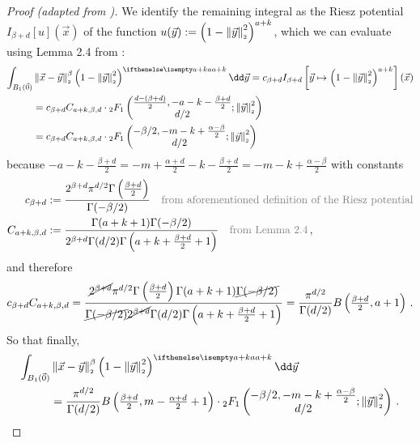 \begin{proof}[Proof (adapted from \cite{2021-arbitrary-dimensions})]
  We identify the remaining integral as the Riesz potential $I_{\beta+d}[u](\vec{x})$ of the function $u(\vec{y}) := \left(1-\left\lVert\vec{y}\right\rVert_{\scriptscriptstyle 2}^2\right)^{a+k}$, which we can evaluate using Lemma 2.4 from \cite{2011-porous-medium-1}:
  \begin{align*}
    \int_{B_1(\vec{0})} & \norm{\vec{x}-\vec{y}}^\beta \weight[a+k]{y} \dd\vec{y} = c_{\beta+d} I_{\beta+d}\left[\vec{y} \mapsto \left(1-\norm{\vec{y}}^2\right)^{a+k}\right](\vec{x}) \\
                        & = c_{\beta+d} C_{a+k, \beta, d} \cdot {}_2F_1\left(\begin{matrix}\frac{d-(\beta+d)}{2}, -a-k-\frac{\beta+d}{2} \\d/2\end{matrix}; \norm{\vec{y}}^2\right)    \\
                        & = c_{\beta+d} C_{a+k, \beta, d} \cdot {}_2F_1\left(\begin{matrix}-\beta/2, -m-k+\frac{\alpha-\beta}{2} \\d/2\end{matrix}; \norm{\vec{y}}^2\right)
  \end{align*}
  because $-a-k-\frac{\beta+d}{2} = -m + \frac{\alpha+d}{2} -k - \frac{\beta+d}{2} = -m-k+\frac{\alpha-\beta}{2}$ with constants
  \begin{align*}
    c_{\beta+d}       & := \frac{2^{\beta+d} \pi^{d/2} \Gamma\left(\frac{\beta+d}{2}\right)}{\Gamma(-\beta/2)}                      \quad \text{\textcolor{gray}{from aforementioned definition of the Riesz potential}} \\
    C_{a+k, \beta, d} & := \frac{\Gamma(a+k+1) \Gamma(-\beta/2)}{2^{\beta+d}\Gamma(d/2) \Gamma\left(a+k+\frac{\beta+d}{2}+1\right)} \quad \text{\textcolor{gray}{from Lemma 2.4}}\,,
  \end{align*}
  and therefore
  $$c_{\beta+d} C_{a+k, \beta, d} = \frac{\cancel{2^{\beta+d}} \pi^{d/2} \Gamma\left(\frac{\beta+d}{2}\right) \Gamma(a+k+1) \cancel{\Gamma(-\beta/2)}}{\cancel{\Gamma(-\beta/2)} \cancel{2^{\beta+d}}\Gamma(d/2) \Gamma\left(a+k+\frac{\beta+d}{2}+1\right)} = \frac{\pi^{d/2}}{\Gamma(d/2)} B\left(\tfrac{\beta+d}{2}, a+1\right)\,.$$
  So that finally,
  \begin{align*}
    \int_{B_1(\vec{0})} & \norm{\vec{x}-\vec{y}}^\beta \weight[a+k]{y} \dd\vec{y}                                                                                                                                                    \\
                        & =\frac{\pi^{d/2}}{\Gamma(d/2)} B\left(\tfrac{\beta+d}{2}, m-\tfrac{\alpha+d}{2}+1\right) \cdot {}_2F_1\left(\begin{matrix}-\beta/2, -m-k+\frac{\alpha-\beta}{2} \\d/2\end{matrix}; \norm{\vec{y}}^2\right)\,.
  \end{align*}
\end{proof}
